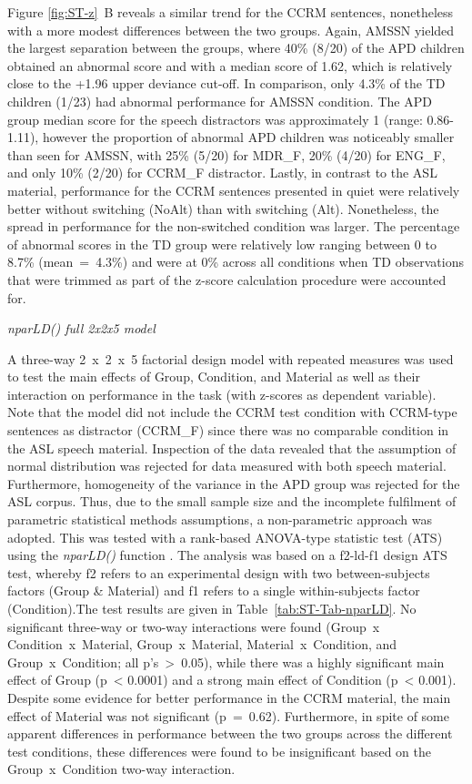 \documentclass[a4paper, twoside]{templates/ociamthesis}
\begin{document}
Figure \ref{fig:ST-z}~B reveals a similar trend for the CCRM sentences, nonetheless with a more modest differences between the two groups. Again, AMSSN yielded the largest separation between the groups, where 40\% (8/20) of the APD children obtained an abnormal score and with a median score of 1.62, which is relatively close to the +1.96 upper deviance cut-off. In comparison, only 4.3\% of the TD children (1/23) had abnormal performance for AMSSN condition. The APD group median score for the speech distractors was approximately 1 (range: 0.86-1.11), however the proportion of abnormal APD children was noticeably smaller than seen for AMSSN, with 25\% (5/20) for MDR\_F, 20\% (4/20) for ENG\_F, and only 10\% (2/20) for CCRM\_F distractor. Lastly, in contrast to the ASL material, performance for the CCRM sentences presented in quiet were relatively better without switching (NoAlt) than with switching (Alt). Nonetheless, the spread in performance for the non-switched condition was larger. The percentage of abnormal scores in the TD group were relatively low ranging between 0 to 8.7\% (mean~=~4.3\%) and were at 0\% across all conditions when TD observations that were trimmed as part of the z-score calculation procedure were accounted for.

\colorbox[HTML]{CCCCFF}{\emph{nparLD() full 2x2x5 model}}

A three-way 2~x~2~x~5 factorial design model with repeated measures was used to test the main effects of Group, Condition, and Material as well as their interaction on performance in the task (with z-scores as dependent variable). Note that the model did not include the CCRM test condition with CCRM-type sentences as distractor (CCRM\_F) since there was no comparable condition in the ASL speech material. Inspection of the data revealed that the assumption of normal distribution was rejected for data measured with both speech material. Furthermore, homogeneity of the variance in the APD group was rejected for the ASL corpus. Thus, due to the small sample size and the incomplete fulfilment of parametric statistical methods assumptions, a non-parametric approach was adopted. This was tested with a rank-based ANOVA-type statistic test (ATS) using the \emph{nparLD()} function \autocite[nparLD package;][]{nparLDPackageR}. The analysis was based on a f2-ld-f1 design ATS test, whereby f2 refers to an experimental design with two between-subjects factors (Group \& Material) and f1 refers to a single within-subjects factor (Condition).The test results are given in Table~\ref{tab:ST-Tab-nparLD}. No significant three-way or two-way interactions were found (Group~x Condition~x~Material, Group~x~Material, Material~x~Condition, and Group~x~Condition; all p's~\textgreater~0.05), while there was a highly significant main effect of Group (p~\textless{} 0.0001) and a strong main effect of Condition (p~\textless{} 0.001). Despite some evidence for better performance in the CCRM material, the main effect of Material was not significant (p~=~0.62). Furthermore, in spite of some apparent differences in performance between the two groups across the different test conditions, these differences were found to be insignificant based on the Group~x~Condition two-way interaction.
\end{document}
